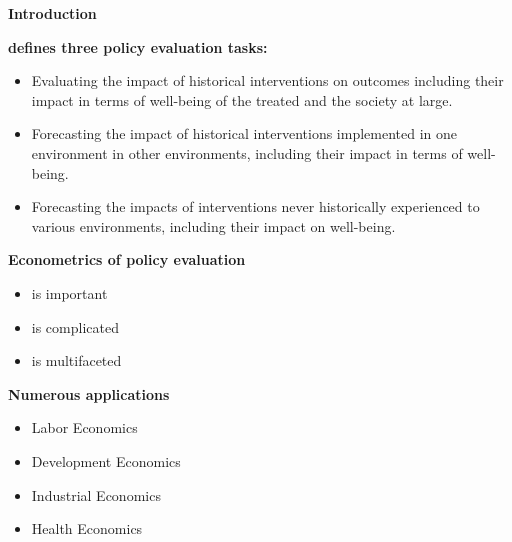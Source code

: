 \begin{frame}\begin{center}
	\LARGE\textbf{Introduction}
\end{center}\end{frame}
\begin{frame}
	\textbf{ defines three policy evaluation tasks:}
	\begin{itemize}\setlength\itemsep{1em}
		\item Evaluating the impact of historical interventions on outcomes including their impact in terms of well-being of the treated and the society at large.
		\item Forecasting the impact of historical interventions implemented in one environment in other environments, including their impact in terms of well-being.
		\item Forecasting the impacts of interventions never historically experienced to various environments, including their impact on well-being.
	\end{itemize}
\end{frame}
\begin{frame}
	\textbf{Econometrics of policy evaluation}\\\vspace{0.3cm}
	\begin{itemize}\setlength\itemsep{1em}
		\item is important
		\item is complicated
		\item is multifaceted
	\end{itemize}
\end{frame}
\begin{frame}
\textbf{Numerous applications}\\\vspace{0.3cm}

	\begin{itemize}\setlength\itemsep{1em}
		\item Labor Economics
		\item Development Economics
		\item Industrial Economics
		\item Health Economics
	\end{itemize}
\end{frame}
